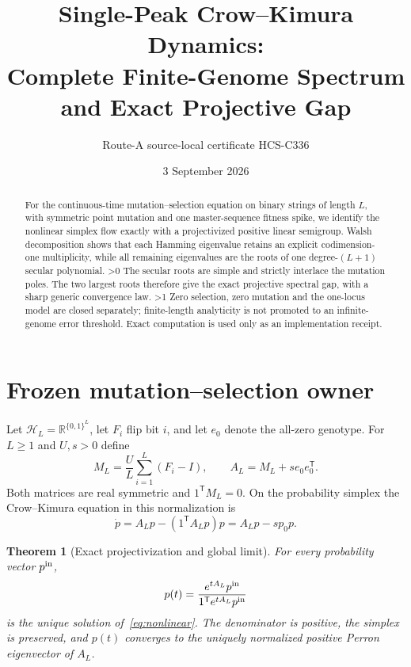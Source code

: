 \documentclass[10pt]{article}
\title{Single-Peak Crow--Kimura Dynamics:\\
Complete Finite-Genome Spectrum and Exact Projective Gap}
\author{Route-A source-local certificate HCS-C336}
\date{3 September 2026}
\providecommand{\CRevisionRound}{2}
\newtheorem{theorem}{Theorem}
\newcommand{\one}{\mathrm{1}}
\newcommand{\cH}{\mathcal H}
\begin{document}
\maketitle
\begin{abstract}
For the continuous-time mutation--selection equation on binary strings of
length $L$, with symmetric point mutation and one master-sequence fitness
spike, we identify the nonlinear simplex flow exactly with a projectivized
positive linear semigroup.  Walsh decomposition shows that each Hamming
eigenvalue retains an explicit codimension-one multiplicity, while all
remaining eigenvalues are the roots of one degree-$(L+1)$ secular polynomial.
\ifnum\CRevisionRound>0
The secular roots are simple and strictly interlace the mutation poles.  The
two largest roots therefore give the exact projective spectral gap, with a
sharp generic convergence law.
\fi
\ifnum\CRevisionRound>1
Zero selection, zero mutation and the one-locus model are closed separately;
finite-length analyticity is not promoted to an infinite-genome error
threshold.  Exact computation is used only as an implementation receipt.
\fi
\end{abstract}

\section{Frozen mutation--selection owner}

Let $\cH_L=\mathbb R^{\{0,1\}^L}$, let $F_i$ flip bit $i$, and let $e_0$
denote the all-zero genotype.  For $L\geq1$ and $U,s>0$ define
\begin{equation}\label{eq:operator}
 M_L=\frac UL\sum_{i=1}^L(F_i-I),\qquad
 A_L=M_L+s e_0e_0^{\mathsf T}.
\end{equation}
Both matrices are real symmetric and $\one^{\mathsf T}M_L=0$.  On the
probability simplex the Crow--Kimura equation in this normalization is
\begin{equation}\label{eq:nonlinear}
 \dot p=A_Lp-(\one^{\mathsf T}A_Lp)p=A_Lp-sp_0p.
\end{equation}

\begin{theorem}[Exact projectivization and global limit]\label{thm:flow}
For every probability vector $p^{\rm in}$,
\begin{equation}\label{eq:quotient}
 p(t)=\frac{e^{tA_L}p^{\rm in}}
 {\one^{\mathsf T}e^{tA_L}p^{\rm in}}
\end{equation}
is the unique solution of~\eqref{eq:nonlinear}.  The denominator is positive,
the simplex is preserved, and $p(t)$ converges to the uniquely normalized
positive Perron eigenvector of $A_L$.
\end{theorem}
\end{document}
